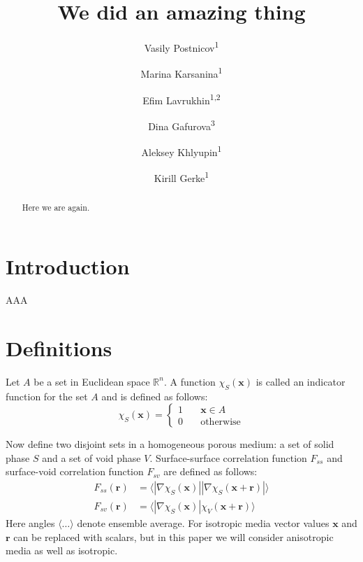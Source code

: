 \documentclass[reprint,amsmath,amssymb,aps,pre,showkeys,showpacs]{revtex4-1}
\begin{document}

\author{Vasily Postnicov\textsuperscript{1}}
\author{Marina Karsanina\textsuperscript{1}}
\author{Efim Lavrukhin\textsuperscript{1,2}}
\author{Dina Gafurova\textsuperscript{3}}
\author{Aleksey Khlyupin\textsuperscript{1}}
\author{Kirill Gerke\textsuperscript{1}}


\title{We did an amazing thing}

\begin{abstract}
  Here we are again.
\end{abstract}

\maketitle

\section{Introduction}
\label{sec:intro}
AAA

\section{Definitions}
\label{sec:def}
Let $A$ be a set in Euclidean space $\mathbb{R}^n$. A function
$\chi_S(\mathbf{x})$ is called an indicator function for the set $A$ and is
defined as follows:
\begin{equation*}
  \chi_S(\bm{x}) = \left\{
  \begin{array}{ll}
    1 & \quad \bm{x} \in A \\
    0 & \quad \text{otherwise}
  \end{array}
  \right.
\end{equation*}

Now define two disjoint sets in a homogeneous porous medium: a set of solid
phase $S$ and a set of void phase $V$. Surface-surface correlation function
$F_{ss}$ and surface-void correlation function $F_{sv}$ are defined as follows:
\begin{align}
  F_{ss}(\bm{r}) &= \langle |\nabla \chi_S(\bm{x})| |\nabla \chi_S(\bm{x} +
  \bm{r})| \rangle \label{eq:fss} \\
  F_{sv}(\bm{r}) &= \langle |\nabla \chi_S(\bm{x})| \chi_V(\bm{x} +
  \bm{r}) \rangle \label{eq:fsv}
\end{align}
Here angles $\langle \dots \rangle$ denote ensemble average. For isotropic media
vector values $\bm{x}$ and $\bm{r}$ can be replaced with scalars, but in this
paper we will consider anisotropic media as well as isotropic.
\end{document}
